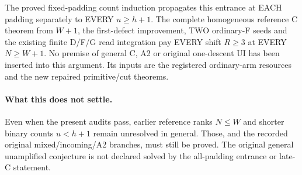 The proved fixed-padding count induction propagates this entrance at
EACH padding separately to EVERY $u\ge h+1$. The complete homogeneous
reference C theorem from $W+1$, the first-defect improvement, TWO
ordinary-F seeds and the existing finite D/F/G read integration pay
EVERY shift $R\ge3$ at EVERY $N\ge W+1$.
No premise of general C, A2 or original one-descent UI has been inserted
into this argument. Its inputs are the registered ordinary-arm
resources and the new repaired primitive/cut theorems.

\paragraph{What this does not settle.}
Even when the present audits pass, earlier reference ranks $N\le W$
and shorter binary counts $u<h+1$ remain unresolved in general.
Those, and the recorded original mixed/incoming/A2 branches, must
still be proved. The original general unamplified conjecture is not
declared solved by the all-padding entrance or late-C statement.
